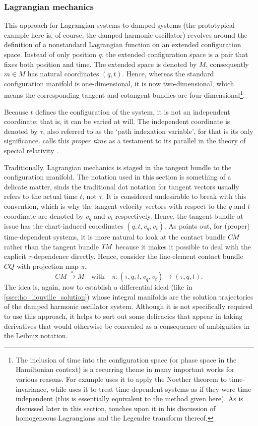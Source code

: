 \subsubsection{Lagrangian mechanics}
\label{sssec:mendel_lagrangian}
This approach for Lagrangian systems to damped systems (the prototypical example here is, of course, the damped harmonic oscillator) revolves around the definition of a nonstandard Lagrangian function on an extended configuration space. Instead of only position $q$, the extended configuration space is a pair that fixes both position and time. The extended space is denoted by $M$, consequently $m \in M$ has natural coordinates $(q, t)$. Hence, whereas the standard configuration manifold is one-dimensional, it is now two-dimensional, which means the corresponding tangent and cotangent bundles are four-dimensional\footnote{The inclusion of time into the configuration space (or phase space in the Hamiltonian context) is a recurring theme in many important works for various reasons. For example \citet[p. 90]{Arnold1989} uses it to apply the Noether theorem to time-invariance, while \cite[p. 332]{Burke1985} uses it to treat time-dependent systems as if they were time-independent (this is essentially equivalent to the method given here). As is discussed later in this section, \citet{Dirac1950} touches upon it in his discussion of homogeneous Lagrangians and the Legendre transform thereof.}.

Because $t$ defines the configuration of the system, it is not an independent coordinate; that is, it can be varied at will. The independent coordinate is denoted by $\tau$, also referred to as the `path indexation variable', for that is its only significance. \citet{Mendel2021} calls this \emph{proper time} as a testament to its parallel in the theory of special relativity \cite{Landau1971}.

Traditionally, Lagrangian mechanics is staged in the tangent bundle to the configuration manifold. The notation used in this section is something of a delicate matter, sinds the traditional dot notation for tangent vectors usually refers to the actual time $t$, not $\tau$. It is considered undesirable to break with this convention, which is why the tangent velocity vectors with respect to the $q$ and $t$-coordinate are denoted by $v_q$ and $v_t$ respectively. Hence, the tangent bundle at issue has the chart-induced coordinates $(q, t, v_q, v_t)$. As \citet{Burke1985} points out, for (proper) time-dependent systems, it is more natural to look at the contact bundle $C\!M$ rather than the tangent bundle $T\!M$ because it makes it possible to deal with the explicit $\tau$-dependence directly. Hence, consider the line-element contact bundle $C\!Q$ with projection map $\pi$,
$$ C\!M \xrightarrow{\pi} M \quad\text{with}\quad \pi: (\tau, q, t, v_q, v_t) \mapsto (\tau, q, t). $$
The idea is, again, now to establish a differential ideal (like in \cref{ssec:ho_liouville_solution}) whose integral manifolds are the solution trajectories of the damped harmonic oscillator system. Although it is not specifically required to use this approach, it helps to sort out some delicacies that appear in taking derivatives that would otherwise be concealed as a consequence of ambiguities in the Leibniz notation.

